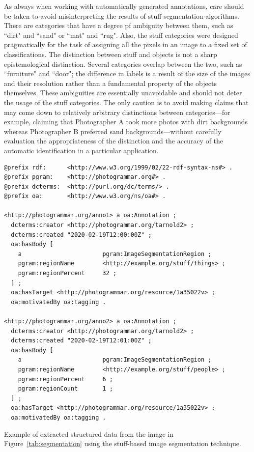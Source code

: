 \documentclass[10pt, a4paper]{article}
\begin{document}
As always when working with automatically generated annotations, care should be
taken to avoid misinterpreting the results of stuff-segmentation algorithms.
There are categories that have a degree pf ambiguity between them, such as ``dirt"
and ``sand" or ``mat" and ``rug". Also, the stuff categories were designed
pragmatically for the task of assigning all the pixels in an image to a
fixed set of classifications. The distinction between stuff and objects is not
a sharp epistemological distinction. Several categories overlap between the
two, such as ``furniture" and ``door"; the difference in labels is a result of
the size of the images and their resolution rather than a fundamental property
of the objects themselves. These ambiguities are essentially unavoidable and
should not deter the usage of the stuff categories. The only caution is to
avoid making claims that may come down to relatively arbitrary distinctions
between categories---for example, claiming that Photographer A took more photos
with dirt backgrounds whereas Photographer B preferred sand backgrounds---without
carefully evaluation the appropriateness of the distinction and the accuracy
of the automatic identification in a particular application.


\begin{lstfloat*}[!ht]
\begin{lstlisting}[frame=single]
@prefix rdf:      <http://www.w3.org/1999/02/22-rdf-syntax-ns#> .
@prefix pgram:    <http://photogrammar.org#> .
@prefix dcterms:  <http://purl.org/dc/terms/> .
@prefix oa:       <http://www.w3.org/ns/oa#> .

<http://photogrammar.org/anno1> a oa:Annotation ;
  dcterms:creator <http://photogrammar.org/tarnold2> ;
  dcterms:created "2020-02-19T12:00:00Z" ;
  oa:hasBody [
    a                       pgram:ImageSegmentationRegion ;
    pgram:regionName        <http://example.org/stuff/things> ;
    pgram:regionPercent     32 ;
  ] ;
  oa:hasTarget <http://photogrammar.org/resource/1a35022v> ;
  oa:motivatedBy oa:tagging .

<http://photogrammar.org/anno2> a oa:Annotation ;
  dcterms:creator <http://photogrammar.org/tarnold2> ;
  dcterms:created "2020-02-19T12:01:00Z" ;
  oa:hasBody [
    a                       pgram:ImageSegmentationRegion ;
    pgram:regionName        <http://example.org/stuff/people> ;
    pgram:regionPercent     6 ;
    pgram:regionCount       1 ;
  ] ;
  oa:hasTarget <http://photogrammar.org/resource/1a35022v> ;
  oa:motivatedBy oa:tagging .
\end{lstlisting}
\caption{Example of extracted structured data from the image in
Figure~\ref{tab:segmentation} using the stuff-based image segmentation
technique.}
\label{schema}
\end{lstfloat*}
\end{document}
